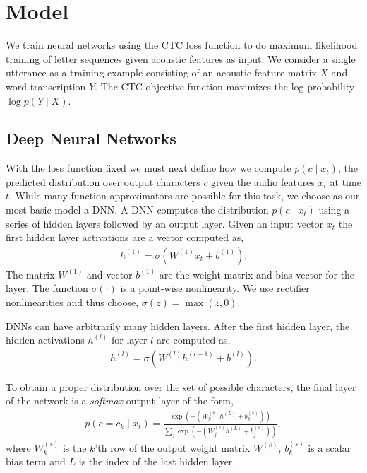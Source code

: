 \section{Model}
\label{sec:first_pass:model}

We train neural networks using the CTC loss function to do maximum likelihood
training of letter sequences given acoustic features as input. We consider a
single utterance as a training example consisting of an acoustic feature matrix
$X$ and word transcription $Y$. The CTC objective function maximizes the log
probability $\log p(Y \mid X)$.

\subsection{Deep Neural Networks}
\label{sec:first_pass:model:dnn}

With the loss function fixed we must next define how we compute $p(c \mid
x_t)$, the predicted distribution over output characters $c$ given the audio
features $x_t$ at time $t$. While many function approximators are possible for
this task, we choose as our most basic model a DNN. A DNN computes the
distribution $p(c \mid x_t)$ using a series of hidden layers followed by an
output layer. Given an input vector $x_t$ the first hidden layer activations
are a vector computed as,
\begin{align*}
  h^{(1)} = \sigma(W^{(1)} x_t + b^{(1)}).
\end{align*}
The matrix $W^{(1)}$ and vector $b^{(1)}$ are the weight matrix and bias vector
for the layer. The function $\sigma(\cdot)$ is a point-wise nonlinearity. We
use rectifier nonlinearities and thus choose, $\sigma(z) = \max (z, 0)$.

DNNs can have arbitrarily many hidden layers. After the first hidden
layer, the hidden activations $h^{(l)}$ for layer $l$ are computed as,
\begin{align*}
  h^{(l)} = \sigma(W^{(l)} h^{(l-1)} + b^{(l)}).
\end{align*}

To obtain a proper distribution over the set of possible characters, the
final layer of the network is a \emph{softmax} output layer of the form,
\begin{align*}
  p(c=c_k \mid x_t) = \frac{\exp(- ( W^{(s)}_k h^{(L)} + b^{(s)}_k))}
  {\sum_j \exp(- ( W^{(s)}_j h^{(L)} + b^{(s)}_j))},
\end{align*}
where $W^{(s)}_k$ is the $k$'th row of the output weight matrix $W^{(s)}$,
$b^{(s)}_k$ is a scalar bias term and $L$ is the index of the last hidden
layer.

